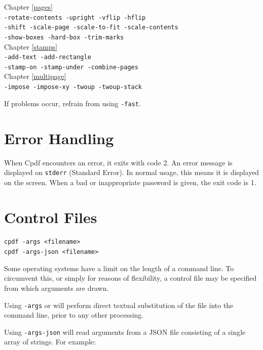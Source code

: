 \documentclass{book}
\begin{document}
\begin{framed}
\small\noindent Chapter \ref{pages}\\
\noindent\small\verb!-rotate-contents -upright -vflip -hflip!\\
\small\verb!-shift -scale-page -scale-to-fit -scale-contents!\\
\small\verb!-show-boxes -hard-box -trim-marks!\\

\noindent Chapter \ref{stamps}\\
\noindent\small\verb!-add-text -add-rectangle!\\
\small\verb!-stamp-on -stamp-under -combine-pages!\\

\noindent Chapter \ref{multipage}\\
\noindent\verb!-impose -impose-xy -twoup -twoup-stack!
\end{framed}

\noindent If problems occur, refrain from using \verb!-fast!.

\section{Error Handling}
When Cpdf encounters an error, it exits with code 2. An error message is
displayed on \texttt{stderr} (Standard Error). In normal usage, this means it is
displayed on the screen. When a bad or inappropriate password is given, the exit code is 1.

\section{Control Files}
\begin{framed}
  \noindent\small\verb!cpdf -args <filename>!\\
  \noindent\small\verb!cpdf -args-json <filename>!
\end{framed}

Some operating systems have a limit on the length of a command line. To
circumvent this, or simply for reasons of flexibility, a control file may be
specified from which arguments are drawn.

Using \texttt{-args} or will perform direct textual substitution of the file into the command line, prior to any other processing.

Using \texttt{-args-json} will read arguments from a JSON file consisting of a single array of strings. For example:
\end{document}
